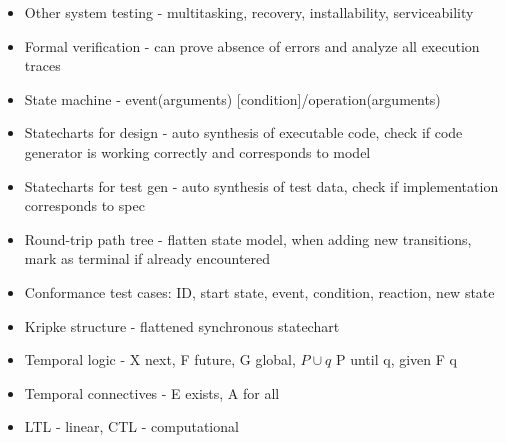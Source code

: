 \documentclass[10pt]{article}
\begin{document}
\begin{multicols}{2}
\begin{itemize}
        \item Other system testing - multitasking, recovery, installability, serviceability
        \item Formal verification - can prove absence of errors and analyze all execution traces
        \item State machine - event(arguments) [condition]/operation(arguments)
        \item Statecharts for design - auto synthesis of executable code, check if code generator is working correctly and corresponds to model 
        \item Statecharts for test gen - auto synthesis of test data, check if implementation corresponds to spec
        \item Round-trip path tree - flatten state model, when adding new transitions, mark as terminal if already encountered
        \item Conformance test cases: ID, start state, event, condition, reaction, new state
        \item Kripke structure - flattened  synchronous statechart 
        \item Temporal logic - X next, F future, G global, $P \cup q$ P until q, given F q
        \item Temporal connectives - E exists, A for all
        \item LTL - linear, CTL - computational
    \end{itemize}
    
\end{multicols}



        



    
\end{document}
